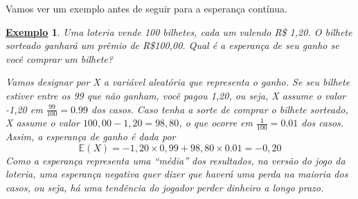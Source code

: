 \documentclass{article}
\newtheorem{example}{\underline{Exemplo}}
\begin{document}
   Vamos ver um exemplo antes de seguir para a esperança contínua. 
  \begin{example}
    Uma loteria vende 100 bilhetes, cada um valendo R\$ 1,20. O bilhete sorteado ganhará um prêmio de R\$100,00.
  Qual é a esperança de seu ganho se você comprar um bilhete?
    
    Vamos designar por X a variável aleatória que representa o ganho. Se seu bilhete estiver entre os 99 que não ganham,
você pagou 1,20, ou seja, X assume o valor -1,20 em \(\frac{99}{100} = 0.99\) dos casos. Caso tenha a sorte de comprar o 
bilhete sorteado, X assume o valor \(100,00 - 1,20 = 98,80\), o que ocorre em \(\frac{1}{100} = 0.01\) dos casos. Assim,
a esperança de ganho é dada por 
  \[
    \mathbb{E}(X) = -1,20\times 0,99 + 98,80\times 0.01 = -0,20
  \]
  Como a esperança representa uma ``média'' dos resultados, na versão do jogo da loteria, uma esperança negativa quer dizer que
haverá uma perda na maioria dos casos, ou seja, há uma tendência do jogador perder dinheiro a longo prazo.
  \end{example}
\end{document}
